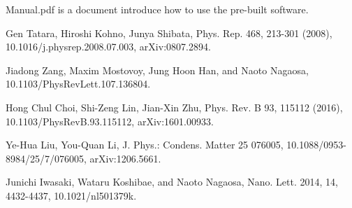 \documentclass[aps,superscriptaddress,groupedaddress]{revtex4}  %
\begin{document}
Manual.pdf is a document introduce how to use the pre-built software.

\begin{thebibliography}{99}


Gen Tatara, Hiroshi Kohno, Junya Shibata, Phys. Rep. 468, 213-301 (2008), 10.1016/j.physrep.2008.07.003, arXiv:0807.2894.

Jiadong Zang, Maxim Mostovoy, Jung Hoon Han, and Naoto Nagaosa, 10.1103/PhysRevLett.107.136804.

Hong Chul Choi, Shi-Zeng Lin, Jian-Xin Zhu, Phys. Rev. B 93, 115112 (2016), 10.1103/PhysRevB.93.115112, arXiv:1601.00933.

Ye-Hua Liu, You-Quan Li, J. Phys.: Condens. Matter 25 076005, 10.1088/0953-8984/25/7/076005, arXiv:1206.5661.

Junichi Iwasaki, Wataru Koshibae, and Naoto Nagaosa, Nano. Lett. 2014, 14, 4432-4437, 10.1021/nl501379k.

\end{thebibliography}
\end{document}
